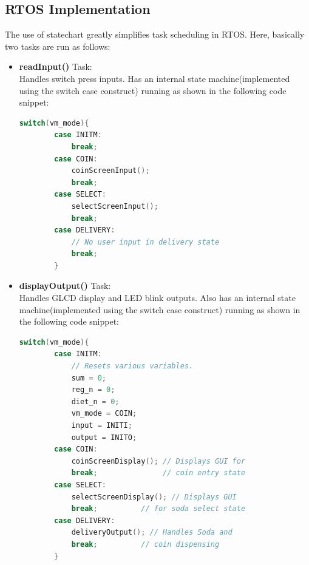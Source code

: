 \documentclass[a4paper,12pt,oneside]{book}
\begin{document}
\subsection{RTOS Implementation}
\qquad The use of statechart greatly simplifies task scheduling in RTOS. Here, basically two tasks are run as follows:
\begin{itemize}
  \item \textbf{{\small readInput()}} Task: \\ \qquad \qquad Handles switch press inputs. Has an internal state machine(implemented using the switch case construct) running as shown in the following code snippet:
  \begin{lstlisting}[basicstyle = \small, language = C]
        switch(vm_mode){
        case INITM:
            break;
        case COIN:
            coinScreenInput();
            break;
        case SELECT:
            selectScreenInput();
            break;
        case DELIVERY:
            // No user input in delivery state
            break;
        }
  \end{lstlisting}
  \item \textbf{{\small displayOutput()}} Task: \\ \qquad \qquad Handles GLCD display and LED blink outputs. Also has an internal state machine(implemented using the switch case construct) running as shown in the following code snippet:
  \begin{lstlisting}[basicstyle = \small, language = C]
        switch(vm_mode){
        case INITM:
            // Resets various variables.
            sum = 0;
            reg_n = 0;
            diet_n = 0;
            vm_mode = COIN;
            input = INITI;
            output = INITO;
        case COIN:
            coinScreenDisplay(); // Displays GUI for 
            break;               // coin entry state
        case SELECT:
            selectScreenDisplay(); // Displays GUI 
            break;          // for soda select state
        case DELIVERY:
            deliveryOutput(); // Handles Soda and 
            break;          // coin dispensing
        }
  \end{lstlisting}
\end{itemize}
\end{document}
